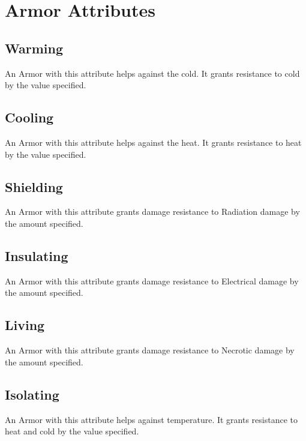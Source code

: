 \section{Armor Attributes}\label{sec:armorAttributes}

\subsection{Warming}\label{armor:warming}
An Armor with this attribute helps against the cold.
It grants resistance to cold by the value specified.

\subsection{Cooling}\label{armor:cooling}
An Armor with this attribute helps against the heat.
It grants resistance to heat by the value specified.

\subsection{Shielding}\label{armor:shielding}
An Armor with this attribute grants damage resistance to Radiation damage by the amount specified.

\subsection{Insulating}\label{armor:insulating}
An Armor with this attribute grants damage resistance to Electrical damage by the amount specified.

\subsection{Living}\label{armor:living}
An Armor with this attribute grants damage resistance to Necrotic damage by the amount specified.

\subsection{Isolating}\label{armor:isolating}
An Armor with this attribute helps against temperature.
It grants resistance to heat and cold by the value specified.

